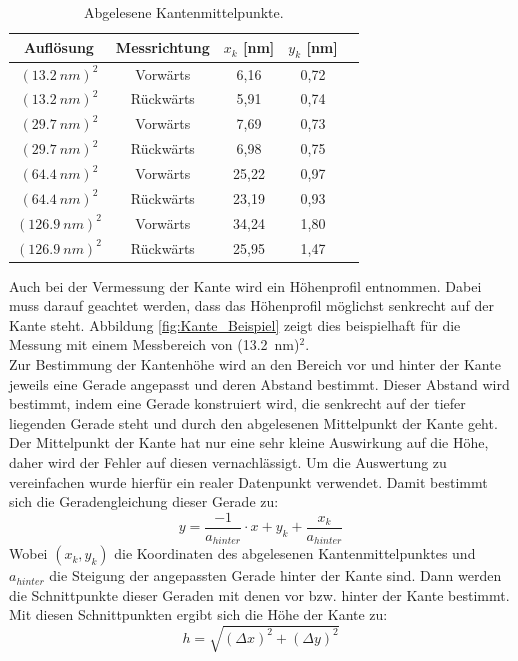 \documentclass[12pt,a4paper]{article}
\begin{document}
\begin{table}
\centering
\begin{tabular}{|c|c|c|c|c|}
\hline 
Auflösung & Messrichtung & $x_k$ [nm] & $y_k$ [nm] \\ 
\hline 
$(\SI{13,2}{nm})^2$ & Vorwärts & 6,16 & 0,72 \\
\hline 
$(\SI{13,2}{nm})^2$ & Rückwärts & 5,91 & 0,74 \\
\hline 
$(\SI{29,7}{nm})^2$ & Vorwärts & 7,69 & 0,73 \\
\hline 
$(\SI{29,7}{nm})^2$ & Rückwärts & 6,98 & 0,75 \\
\hline 
$(\SI{64,4}{nm})^2$ & Vorwärts & 25,22 & 0,97 \\
\hline 
$(\SI{64,4}{nm})^2$ & Rückwärts & 23,19 & 0,93 \\
\hline 
$(\SI{126,9}{nm})^2$ & Vorwärts & 34,24 & 1,80 \\
\hline 
$(\SI{126,9}{nm})^2$ & Rückwärts & 25,95 & 1,47 \\
\hline 
\end{tabular} 
\caption{Abgelesene Kantenmittelpunkte.}
\label{tab:Kantenmittelpunkte_Ergebnisse}
\end{table}

Auch bei der Vermessung der Kante wird ein Höhenprofil entnommen. Dabei muss darauf geachtet werden, dass das Höhenprofil möglichst senkrecht auf der Kante steht. Abbildung \ref{fig:Kante_Beispiel} zeigt dies beispielhaft für die Messung mit einem Messbereich von (\SI{13,2}{nm})$^2$.\\
Zur Bestimmung der Kantenhöhe wird an den Bereich vor und hinter der Kante jeweils eine Gerade angepasst und deren Abstand bestimmt. Dieser Abstand wird bestimmt, indem eine Gerade konstruiert wird, die senkrecht auf der tiefer liegenden Gerade steht und durch den abgelesenen Mittelpunkt der Kante geht. Der Mittelpunkt der Kante hat nur eine sehr kleine Auswirkung auf die Höhe, daher wird der Fehler auf diesen vernachlässigt. Um die Auswertung zu vereinfachen wurde hierfür ein realer Datenpunkt verwendet. Damit bestimmt sich die Geradengleichung dieser Gerade zu:
\begin{equation*}
y = \dfrac{-1}{a_{hinter}} \cdot x + y_k + \dfrac{x_k}{a_{hinter}}
\end{equation*}
Wobei $(x_k, y_k)$ die Koordinaten des abgelesenen Kantenmittelpunktes und $a_{hinter}$ die Steigung der angepassten Gerade hinter der Kante sind. Dann werden die Schnittpunkte dieser Geraden mit denen vor bzw. hinter der Kante bestimmt. Mit diesen Schnittpunkten ergibt sich die Höhe der Kante zu:
\begin{equation*}
h = \sqrt{(\Delta x)^2 + (\Delta y)^2}
\end{equation*}
\end{document}
